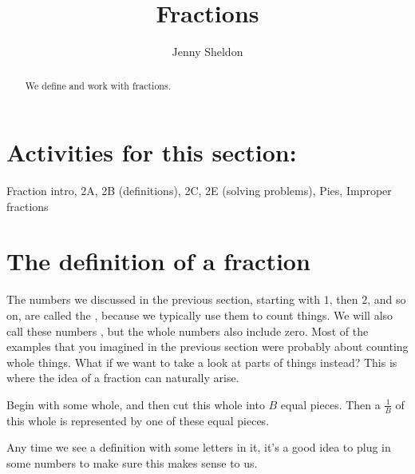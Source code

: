 \documentclass{ximera}
\title{Fractions}
\author{Jenny Sheldon}
\begin{document}
\begin{abstract}
We define and work with fractions.
\end{abstract}
\maketitle

\section{Activities for this section:} Fraction intro, 2A, 2B (definitions), 2C, 2E (solving problems), Pies, Improper fractions

\section{The definition of a fraction}

The numbers we discussed in the previous section, starting with $1$, then $2$, and so on, are called the , because we typically use them to count things. We will also call these numbers , but the whole numbers also include zero. Most of the examples that you imagined in the previous section were probably about counting whole things. What if we want to take a look at parts of things instead? This is where the idea of a fraction can naturally arise. 

\begin{definition}
Begin with some whole, and then cut this whole into $B$ equal pieces. Then a  $\frac{1}{B}$ of this whole is represented by one of these equal pieces.
\end{definition}
Any time we see a definition with some letters in it, it's a good idea to plug in some numbers to make sure this makes sense to us.
\end{document}
